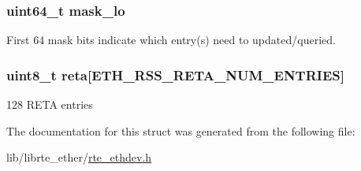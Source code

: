 \subsubsection[{mask\+\_\+lo}]{\setlength{\rightskip}{0pt plus 5cm}uint64\+\_\+t mask\+\_\+lo}\label{structrte__eth__rss__reta_a58e9ef082eae235a9368b0b9cf930b02}
First 64 mask bits indicate which entry(s) need to updated/queried. \hypertarget{structrte__eth__rss__reta_a2bd3f48a0cc83dacf87909d96866e01d}{}
\subsubsection[{reta}]{\setlength{\rightskip}{0pt plus 5cm}uint8\+\_\+t reta\mbox{[}E\+T\+H\+\_\+\+R\+S\+S\+\_\+\+R\+E\+T\+A\+\_\+\+N\+U\+M\+\_\+\+E\+N\+T\+R\+I\+E\+S\mbox{]}}\label{structrte__eth__rss__reta_a2bd3f48a0cc83dacf87909d96866e01d}
128 R\+E\+T\+A entries 

The documentation for this struct was generated from the following file\+:\begin{DoxyCompactItemize}
\item 
lib/librte\+\_\+ether/\hyperlink{rte__ethdev_8h}{rte\+\_\+ethdev.\+h}\end{DoxyCompactItemize}
